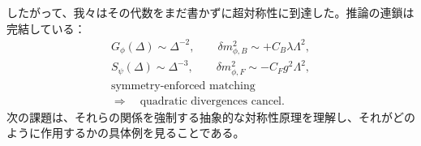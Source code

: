 したがって、我々はその代数をまだ書かずに超対称性に到達した。推論の連鎖は完結している：
\begin{equation}
\begin{gathered}
G_\phi(\Delta)\sim \Delta^{-2},
\qquad
\delta m_{\phi,B}^2\sim+C_B\lambda\Lambda^2,\\[0.4em]
S_\psi(\Delta)\sim \Delta^{-3},
\qquad
\delta m_{\phi,F}^2\sim-C_Fg^2\Lambda^2,\\[0.4em]
\text{symmetry-enforced matching}\\
\Longrightarrow\quad
\text{quadratic divergences cancel}.
\end{gathered}
\end{equation}
次の課題は、それらの関係を強制する抽象的な対称性原理を理解し、それがどのように作用するかの具体例を見ることである。